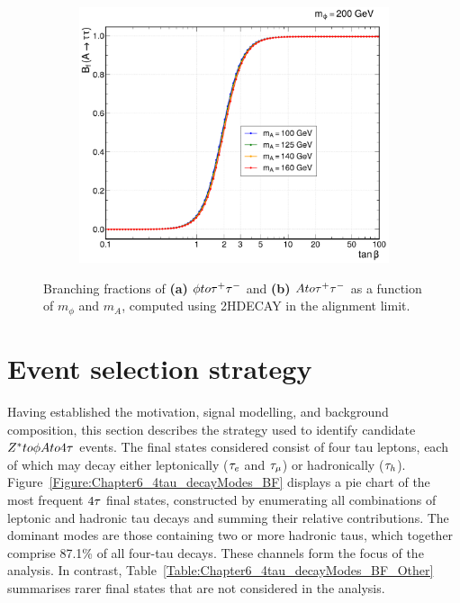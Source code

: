 \begin{figure}[h]
\begin{subfigure}[b]{0.49\textwidth}
            \includegraphics[width=\textwidth]{Figures/Chapter6/A_BR.pdf}
            \caption{}
        \end{subfigure}
    \caption[Branching fractions of $\phi$ and $A$ to $\PGt^+\PGt^-$ for selected mass combinations.]{Branching fractions of \textbf{(a)} $\phi to \tau^+\tau^-$ and \textbf{(b)} $A to \tau^+\tau^-$ as a function of $m_\phi$ and $m_A$, computed using \textsc{2HDECAY} in the alignment limit.}
    \label{Figure:Chapter6_BranchingFractions}
\end{figure}

\section{Event selection strategy}
\label{sec:ObjectAndEventSelections}

Having established the motivation, signal modelling, and background composition, this section describes the strategy used to identify candidate $Z^* to \phi A to 4\tau$ events. The final states considered consist of four tau leptons, each of which may decay either leptonically ($\tau_e$ and $\tau_{\mu}$) or hadronically ($\tau_h$). Figure~\ref{Figure:Chapter6_4tau_decayModes_BF} displays a pie chart of the most frequent $4\tau$ final states, constructed by enumerating all combinations of leptonic and hadronic tau decays and summing their relative contributions. The dominant modes are those containing two or more hadronic taus, which together comprise 87.1\% of all four-tau decays. These channels form the focus of the analysis. In contrast, Table~\ref{Table:Chapter6_4tau_decayModes_BF_Other} summarises rarer final states that are not considered in the analysis.

